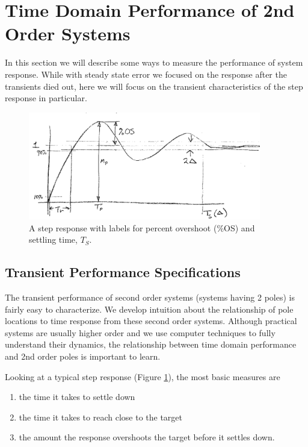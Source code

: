 \section{Time Domain Performance of 2nd Order Systems}

In this section we will describe some ways to measure the performance of system response.  While with steady state error we focused on the response after the transients died out, here we will focus on the transient characteristics of the step response in particular.

\begin{figure}\centering
\includegraphics[width=4.0in]{figs11/00472a.png}
\caption{A step response with labels for percent overshoot (\%OS) and settling time, $T_S$.}\label{stepresponse}
\end{figure}


\subsection{Transient Performance Specifications}\label{SPlaneRegionsSpecifications}

The transient performance of second order systems (systems having 2 poles) is fairly easy to characterize.  We develop intuition about the relationship of pole locations to time response from these second order systems.  Although practical systems are usually higher order and we use computer techniques to fully understand their dynamics, the relationship between time domain performance and 2nd order poles is important to learn.

Looking at a typical step response (Figure \ref{stepresponse}), the most basic measures are
\begin{enumerate}
    \item the time it takes to settle down
    \item the time it takes to reach close to the target
    \item the amount the response overshoots the target before it settles down.
\end{enumerate}

